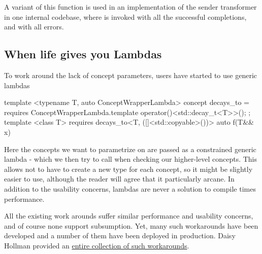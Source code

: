 \documentclass{wg21}
\begin{document}
A variant of this function is used in an implementation of the  sender transformer in one internal codebase,
where  is invoked with all the successful completions, and  with all errors.


\subsection{When life gives you Lambdas}

To work around the lack of concept parameters, users have started to use generic lambdas

\begin{colorblock}
template <typename T, auto ConceptWrapperLambda>
concept decays_to = requires {
    ConceptWrapperLambda.template operator()<std::decay_t<T>>();
};
template <class T>
requires decays_to<T, ([]<std::copyable>(){})>
auto f(T&& x) {}
\end{colorblock}

Here the concepts we want to parametrize on are passed as a constrained generic lambda - which we then try to call when checking our higher-level concepts.
This allows not to have to create a new type for each concept, so it might be slightly easier to use, although the reader will agree that it particularly arcane.
In addition to the usability concerns, lambdas are never a solution to compile times performance.

All the existing work arounds suffer similar performance and usability concerns, and of course none support subsumption.
Yet, many such workarounds have been developed and a number of them have been deployed in production.
Daisy Hollman provided an \href{https://p2841.godbolt.org/z/efYK1crb3}{entire collection of such workarounds}.

\pagebreak
\end{document}
